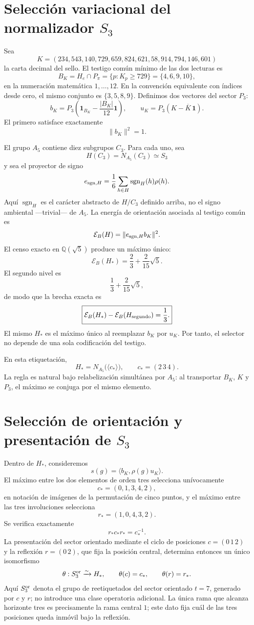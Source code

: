 \section{Selección variacional del normalizador \texorpdfstring{\(S_3\)}{S3}}

Sea
\[
 K=(234,543,140,729,659,824,621,58,914,794,146,601)
\]
la carta decimal del sello. El testigo común mínimo de las dos lecturas es
\[
 B_K=H_e\cap P_\pi
 =\{p:K_p\ge729\}
 =\{4,6,9,10\},
\]
en la numeración matemática \(1,\ldots,12\). En la convención equivalente
con índices desde cero, el mismo conjunto es \(\{3,5,8,9\}\). Definimos dos
vectores del sector \(P_3\):
\[
 b_K=P_3\left(\mathbf1_{B_K}-\frac{|B_K|}{12}\mathbf1\right),
 \qquad
 u_K=P_3\left(K-\overline K\,\mathbf1\right).
\]
El primero satisface exactamente
\[
 \|b_K\|^2=1.
\]

El grupo \(A_5\) contiene diez subgrupos \(C_3\). Para cada uno, sea
\[
 H(C_3)=N_{A_5}(C_3)\simeq S_3
\]
y sea el proyector de signo
\[
 e_{{\rm sgn},H}
 =\frac16\sum_{h\in H}\operatorname{sgn}_H(h)\rho(h).
\]
Aquí \(\operatorname{sgn}_H\) es el carácter abstracto de \(H/C_3\)
definido arriba, no el signo ambiental —trivial— de \(A_5\).
La energía de orientación asociada al testigo común es
\[
 \mathcal E_B(H)=\|e_{{\rm sgn},H}b_K\|^2.
\]
El censo exacto en \(\mathbb Q(\sqrt5)\) produce un máximo único:
\[
 \mathcal E_B(H_*)
 =\frac23+\frac{2}{15}\sqrt5.
\]
El segundo nivel es
\[
 \frac13+\frac{2}{15}\sqrt5,
\]
de modo que la brecha exacta es
\[
 \boxed{\mathcal E_B(H_*)-\mathcal E_B(H_{\rm segundo})=\frac13.}
\]
El mismo \(H_*\) es el máximo único al reemplazar \(b_K\) por \(u_K\).
Por tanto, el selector no depende de una sola codificación del testigo.

En esta etiquetación,
\[
 H_*=N_{A_5}\bigl(\langle c_*\rangle\bigr),
\qquad
 c_*=(2\,3\,4).
\]
La regla es natural bajo relabelización simultánea por \(A_5\): al
transportar \(B_K\), \(K\) y \(P_3\), el máximo se conjuga por el mismo
elemento.

\section{Selección de orientación y presentación de \texorpdfstring{\(S_3\)}{S3}}

Dentro de \(H_*\), consideremos
\[
 s(g)=\langle b_K,\rho(g)u_K\rangle.
\]
El máximo entre los dos elementos de orden tres selecciona unívocamente
\[
 c_*=(0,1,3,4,2),
\]
en notación de imágenes de la permutación de cinco puntos, y el máximo entre
las tres involuciones selecciona
\[
 r_*=(1,0,4,3,2).
\]
Se verifica exactamente
\[
 r_*c_*r_*=c_*^{-1}.
\]
La presentación del sector orientado mediante el ciclo de posiciones
\(c=(0\,1\,2)\) y la reflexión \(r=(0\,2)\), que fija la posición central,
determina entonces un único isomorfismo
\[
 \theta:S_3^{\rm or}\xrightarrow{\sim}H_*,
 \qquad
 \theta(c)=c_*,
 \qquad
 \theta(r)=r_*.
\]
Aquí \(S_3^{\rm or}\) denota el grupo de reetiquetados del sector orientado
\(t=7\), generado por \(c\) y \(r\); no introduce una clase operatoria
adicional.
La única rama que alcanza horizonte tres es precisamente la rama central
\(1\); este dato fija cuál de las tres posiciones queda inmóvil bajo la
reflexión.

